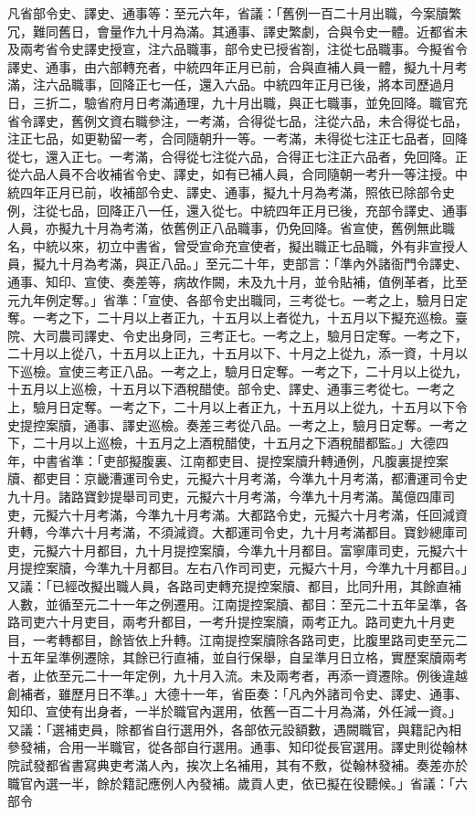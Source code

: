 \begin{pinyinscope}
 凡省部令史、譯史、通事等：至元六年，省議：「舊例一百二十月出職，今案牘繁冗，難同舊日，會量作九十月為滿。其通事、譯史繁劇，合與令史一體。近都省未及兩考省令史譯史授宣，注六品職事，部令史已授省劄，注從七品職事。今擬省令譯史、通事，由六部轉充者，中統四年正月已前，合與直補人員一體，擬九十月考滿，注六品職事，回降正七一任，還入六品。中統四年正月已後，將本司歷過月日，三折二，驗省府月日考滿通理，九十月出職，與正七職事，並免回降。職官充省令譯史，舊例文資右職參注，一考滿，合得從七品，注從六品，未合得從七品，注正七品，如更勒留一考，合同隨朝升一等。一考滿，未得從七注正七品者，回降從七，還入正七。一考滿，合得從七注從六品，合得正七注正六品者，免回降。正從六品人員不合收補省令史、譯史，如有已補人員，合同隨朝一考升一等注授。中統四年正月已前，收補部令史、譯史、通事，擬九十月為考滿，照依已除部令史例，注從七品，回降正八一任，還入從七。中統四年正月已後，充部令譯史、通事人員，亦擬九十月為考滿，依舊例正八品職事，仍免回降。省宣使，舊例無此職名，中統以來，初立中書省，曾受宣命充宣使者，擬出職正七品職，外有非宣授人員，擬九十月為考滿，與正八品。」至元二十年，吏部言：「準內外諸衙門令譯史、通事、知印、宣使、奏差等，病故作闕，未及九十月，並令貼補，值例革者，比至元九年例定奪。」省準：「宣使、各部令史出職同，三考從七。一考之上，驗月日定奪。一考之下，二十月以上者正九，十五月以上者從九，十五月以下擬充巡檢。臺院、大司農司譯史、令史出身同，三考正七。一考之上，驗月日定奪。一考之下，二十月以上從八，十五月以上正九，十五月以下、十月之上從九，添一資，十月以下巡檢。宣使三考正八品。一考之上，驗月日定奪。一考之下，二十月以上從九，十五月以上巡檢，十五月以下酒稅醋使。部令史、譯史、通事三考從七。一考之上，驗月日定奪。一考之下，二十月以上者正九，十五月以上從九，十五月以下令史提控案牘，通事、譯史巡檢。奏差三考從八品。一考之上，驗月日定奪。一考之下，二十月以上巡檢，十五月之上酒稅醋使，十五月之下酒稅醋都監。」大德四年，中書省準：「吏部擬腹裏、江南都吏目、提控案牘升轉通例，凡腹裏提控案牘、都吏目：京畿漕運司令史，元擬六十月考滿，今準九十月考滿，都漕運司令史九十月。諸路寶鈔提舉司司吏，元擬六十月考滿，今準九十月考滿。萬億四庫司吏，元擬六十月考滿，今準九十月考滿。大都路令史，元擬六十月考滿，任回減資升轉，今準六十月考滿，不須減資。大都運司令史，九十月考滿都目。寶鈔總庫司吏，元擬六十月都目，九十月提控案牘，今準九十月都目。富寧庫司吏，元擬六十月提控案牘，今準九十月都目。左右八作司司吏，元擬六十月，今準九十月都目。」又議：「已經改擬出職人員，各路司吏轉充提控案牘、都目，比同升用，其餘直補人數，並循至元二十一年之例遷用。江南提控案牘、都目：至元二十五年呈準，各路司吏六十月吏目，兩考升都目，一考升提控案牘，兩考正九。路司吏九十月吏目，一考轉都目，餘皆依上升轉。江南提控案牘除各路司吏，比腹里路司吏至元二十五年呈準例遷除，其餘已行直補，並自行保舉，自呈準月日立格，實歷案牘兩考者，止依至元二十一年定例，九十月入流。未及兩考者，再添一資遷除。例後違越創補者，雖歷月日不準。」大德十一年，省臣奏：「凡內外諸司令史、譯史、通事、知印、宣使有出身者，一半於職官內選用，依舊一百二十月為滿，外任減一資。」又議：「選補吏員，除都省自行選用外，各部依元設額數，遇闕職官，與籍記內相參發補，合用一半職官，從各部自行選用。通事、知印從長官選用。譯史則從翰林院試發都省書寫典吏考滿人內，挨次上名補用，其有不敷，從翰林發補。奏差亦於職官內選一半，餘於籍記應例人內發補。歲貢人吏，依已擬在役聽候。」省議：「六部令
\end{pinyinscope}
